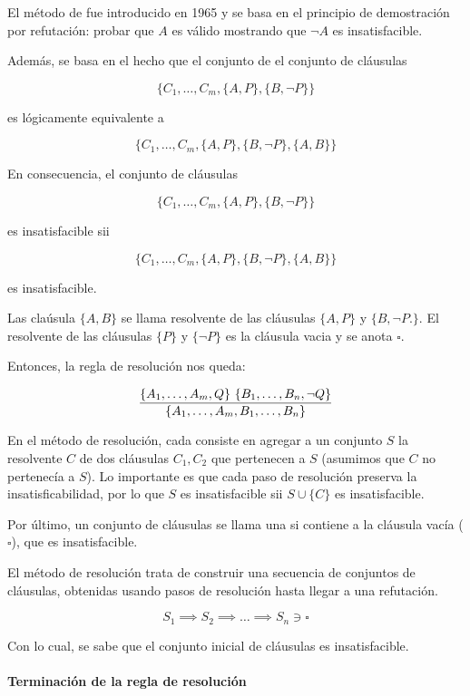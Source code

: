 El método de  fue introducido en 1965 y se basa en el principio de demostración por refutación: probar que $A$ es válido mostrando que $\lnot A$ es insatisfacible.

Además, se basa en el hecho que el conjunto de el conjunto de cláusulas

\[\{C_1, \dots, C_m, \{A,P\}, \{B, \lnot P\}\}\]

es lógicamente equivalente a

\[\{C_1, \dots, C_m, \{A,P\}, \{B, \lnot P\}, \{A,B\}\}\]

En consecuencia, el conjunto de cláusulas

\[\{C_1, \dots, C_m, \{A,P\}, \{B, \lnot P\}\}\]

es insatisfacible sii

\[\{C_1, \dots, C_m, \{A,P\}, \{B, \lnot P\}, \{A,B\}\}\]

es insatisfacible.

Las claúsula $\{A,B\}$ se llama resolvente de las cláusulas $\{A, P\}$ y $\{B, \lnot P.\}$. El resolvente de las cláusulas $\{P\}$ y $\{\lnot P\}$ es la cláusula vacia y se anota $\square$.

Entonces, la regla de resolución nos queda:

\[\resol{\{A_1,\dots,A_m,Q\}\ \{B_1,\dots,B_n,\lnot Q\}}{\{A_1,\dots,A_m, B_1,\dots,B_n\}}\]

En el método de resolución, cada  consiste en agregar a un conjunto $S$ la resolvente $C$ de dos cláusulas $C_1, C_2$ que pertenecen a $S$ (asumimos que $C$ no pertenecía a $S$). Lo importante es que cada paso de resolución preserva la insatisficabilidad, por lo que $S$ es insatisfacible sii $S \cup \{C\}$ es insatisfacible.

Por último, un conjunto de cláusulas se llama una  si contiene a la cláusula vacía ($\square$), que es insatisfacible.

El método de resolución trata de construir una secuencia de conjuntos de cláusulas, obtenidas usando pasos de resolución hasta llegar a una refutación.

\[S_1 \implies S_2 \implies \dots \implies S_n \ni \square\]

Con lo cual, se sabe que el conjunto inicial de cláusulas es insatisfacible.

\paragraph{Terminación de la regla de resolución}

